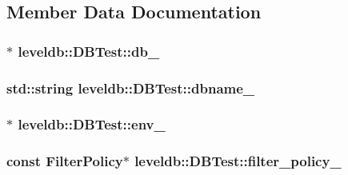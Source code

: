\subsection{Member Data Documentation}
\hypertarget{classleveldb_1_1_d_b_test_a2c3db8773f1aa15128432a87489b0d5a}{
\subsubsection[{db\-\_\-}]{$\ast$ leveldb\-::\-D\-B\-Test\-::db\-\_\-}}\label{classleveldb_1_1_d_b_test_a2c3db8773f1aa15128432a87489b0d5a}
\hypertarget{classleveldb_1_1_d_b_test_ab7eb9815f522ad154816d72d1cc23a86}{
\subsubsection[{dbname\-\_\-}]{\setlength{\rightskip}{0pt plus 5cm}std\-::string leveldb\-::\-D\-B\-Test\-::dbname\-\_\-}}\label{classleveldb_1_1_d_b_test_ab7eb9815f522ad154816d72d1cc23a86}
\hypertarget{classleveldb_1_1_d_b_test_ae6bb66675fe5419ed647efd1bfd332f8}{
\subsubsection[{env\-\_\-}]{$\ast$ leveldb\-::\-D\-B\-Test\-::env\-\_\-}}\label{classleveldb_1_1_d_b_test_ae6bb66675fe5419ed647efd1bfd332f8}
\hypertarget{classleveldb_1_1_d_b_test_aa4bc31daa4cd4def3163c638f623d101}{
\subsubsection[{filter\-\_\-policy\-\_\-}]{\setlength{\rightskip}{0pt plus 5cm}const {\bf Filter\-Policy}$\ast$ leveldb\-::\-D\-B\-Test\-::filter\-\_\-policy\-\_\-\hspace{0.3cm}{\ttfamily [private]}}}\label{classleveldb_1_1_d_b_test_aa4bc31daa4cd4def3163c638f623d101}
